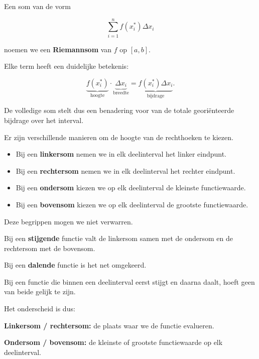\documentclass{ximera}
\begin{document}
\begin{definitie}
Een som van de vorm

\[
\sum_{i=1}^{n} f(x_i^\ast)\Delta x_i
\]

noemen we een \textbf{Riemannsom} van \(f\) op \([a,b]\).
\end{definitie}

Elke term heeft een duidelijke betekenis:

\[
\underbrace{f(x_i^\ast)}_{\text{hoogte}}
\cdot
\underbrace{\Delta x_i}_{\text{breedte}}
=
\underbrace{f(x_i^\ast)\Delta x_i}_{\text{bijdrage}}.
\]

De volledige som stelt dus een benadering voor van de totale
georiënteerde bijdrage over het interval.




Er zijn verschillende manieren om de hoogte van de rechthoeken te kiezen.

\begin{itemize}
    \item Bij een \textbf{linkersom} nemen we in elk deelinterval het
          linker eindpunt.
    \item Bij een \textbf{rechtersom} nemen we in elk deelinterval het
          rechter eindpunt.
    \item Bij een \textbf{ondersom} kiezen we op elk deelinterval de
          kleinste functiewaarde.
    \item Bij een \textbf{bovensom} kiezen we op elk deelinterval de
          grootste functiewaarde.
\end{itemize}

Deze begrippen mogen we niet verwarren.

\begin{opmerking}
Bij een \textbf{stijgende} functie valt de linkersom samen met de
ondersom en de rechtersom met de bovensom.

Bij een \textbf{dalende} functie is het net omgekeerd.

Bij een functie die binnen een deelinterval eerst stijgt en daarna daalt,
hoeft geen van beide gelijk te zijn.
\end{opmerking}

Het onderscheid is dus:

\begin{center}
\textbf{Linkersom / rechtersom:} de plaats waar we de functie evalueren.

\textbf{Ondersom / bovensom:} de kleinste of grootste functiewaarde
op elk deelinterval.
\end{center}
\end{document}

